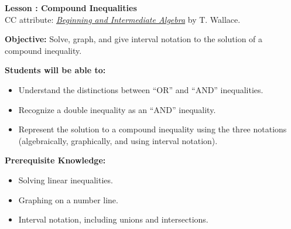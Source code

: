\documentclass[12pt]{article}
\theoremstyle{definition}
\begin{document}
{\bf \large Lesson : Compound Inequalities}
\\ CC attribute: \href{http://www.wallace.ccfaculty.org/book/book.html}{\it{Beginning and Intermediate Algebra}} by T. Wallace. 
\hfill \doclicenseImage[imagewidth=5em]\\
\par
{\bf Objective:} Solve, graph, and give interval notation to the solution
of a compound inequality.\\
\par
{\bf Students will be able to:}
\begin{itemize}
	\item Understand the distinctions between ``OR'' and ``AND'' inequalities.
	\item Recognize a double inequality as an ``AND'' inequality.
	\item Represent the solution to a compound inequality using the three notations (algebraically, graphically, and using interval notation).
\end{itemize}
{\bf Prerequisite Knowledge:}
\begin{itemize}
	\item Solving linear inequalities.
	\item Graphing on a number line.
	\item Interval notation, including unions and intersections.
\end{itemize}
\hrulefill
\end{document}
